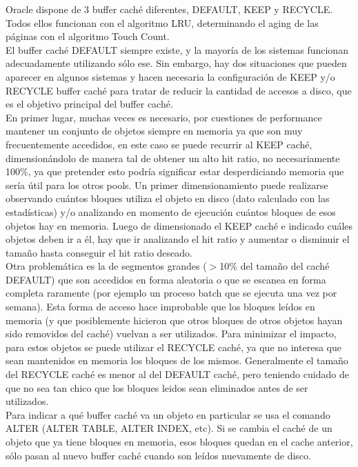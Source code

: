 \documentclass[a4paper,10pt]{article}
\begin{document}
Oracle dispone de 3 buffer caché diferentes, DEFAULT, KEEP y RECYCLE. Todos ellos funcionan con el algoritmo LRU, determinando el aging de las páginas con el algoritmo Touch Count.\\

El buffer caché DEFAULT siempre existe, y la mayoría de los sistemas funcionan adecuadamente utilizando sólo ese. Sin embargo, hay dos situaciones que pueden aparecer en algunos sistemas y hacen necesaria la configuración de KEEP y/o RECYCLE buffer caché para tratar de reducir la cantidad de accesos a disco, que es el objetivo principal del buffer caché.\\

En primer lugar, muchas veces es necesario, por cuestiones de performance mantener un conjunto de objetos siempre en memoria ya que son muy frecuentemente accedidos, en este caso se puede recurrir al KEEP caché, dimensionándolo de manera tal de obtener un alto hit ratio, no necesariamente 100\%, ya que pretender esto podría significar estar desperdiciando memoria que sería útil para los otros pools. Un primer  dimensionamiento puede realizarse observando cuántos bloques utiliza el objeto en disco (dato calculado con las estadísticas) y/o analizando en momento de ejecución cuántos bloques de esos objetos hay en memoria. Luego de dimensionado el KEEP caché e indicado cuáles objetos deben ir a él, hay que ir analizando el hit ratio y aumentar o disminuir el tamaño hasta conseguir el hit ratio deseado.\\

Otra problemática es la de segmentos grandes ($>$10\% del tamaño del caché DEFAULT) que son accedidos en forma aleatoria o que se escanea en forma completa raramente (por ejemplo un proceso batch que se ejecuta una vez por semana). Esta forma de acceso hace  improbable que los bloques leídos en memoria (y que posiblemente hicieron que otros bloques de otros objetos hayan sido removidos del caché) vuelvan a ser utilizados. Para minimizar el impacto, para estos objetos se puede utilizar el RECYCLE caché, ya que no interesa que sean mantenidos en memoria los bloques de los mismos. Generalmente el tamaño del RECYCLE caché es menor al del DEFAULT caché, pero teniendo cuidado de que no sea tan chico que los bloques leidos sean eliminados antes de ser utilizados.\\

Para indicar a qué buffer caché va un objeto en particular se usa el comando ALTER (ALTER TABLE, ALTER INDEX, etc). Si se cambia el caché de un objeto que ya tiene bloques en memoria, esos bloques quedan en el cache anterior, sólo pasan al nuevo buffer caché cuando son leídos nuevamente de disco.\\
\end{document}
